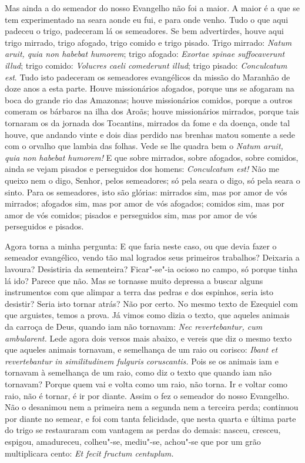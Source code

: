 Mas ainda a do semeador do nosso Evangelho não foi a maior. A maior é a
que se tem experimentado na seara aonde eu fui, e para onde venho. Tudo
o que aqui padeceu o trigo, padeceram lá os semeadores. Se bem
advertirdes, houve aqui trigo mirrado, trigo afogado, trigo comido e
trigo pisado. Trigo mirrado: \emph{Natum aruit, quia non habebat
humorem}; trigo afogado: \emph{Exortae spinae suffocaverunt illud};
trigo comido: \emph{Volucres caeli comederunt illud}; trigo pisado:
\emph{Conculcatum est}. Tudo isto padeceram os semeadores evangélicos
da missão do Maranhão de doze anos a esta parte. Houve missionários
afogados, porque uns se afogaram na boca do grande rio das Amazonas;
houve missionários comidos, porque a outros comeram os bárbaros na ilha
dos Aroãs; houve missionários mirrados, porque tais tornaram os da
jornada dos Tocantins, mirrados da fome e da doença, onde tal houve, que
andando vinte e dois dias perdido nas brenhas matou somente a sede com o
orvalho que lambia das folhas. Vede se lhe quadra bem o \emph{Natum
aruit, quia non habebat humorem!} E que sobre mirrados, sobre
afogados, sobre comidos, ainda se vejam pisados e perseguidos dos
homens: \emph{Conculcatum est!} Não me queixo nem o digo, Senhor, pelos
semeadores; só pela seara o digo, só pela seara o sinto. Para os
semeadores, isto são glórias: mirrados sim, mas por amor de vós
mirrados; afogados sim, mas por amor de vós
afogados; comidos sim, mas por amor de vós comidos; pisados e
perseguidos sim, mas por amor de vós perseguidos e pisados.

Agora torna a minha pergunta: E que faria neste caso, ou que devia fazer
o semeador evangélico, vendo tão mal logrados seus primeiros trabalhos?
Deixaria a lavoura? Desistiria da sementeira? Ficar"-se"-ia ocioso no
campo, só porque tinha lá ido? Parece que não. Mas se tornasse muito
depressa a buscar alguns instrumentos com que alimpar a terra das
pedras e dos espinhos, seria isto desistir? Seria isto tornar atrás?
Não por certo. No mesmo texto de Ezequiel com que arguistes, temos a
prova. Já vimos como dizia o texto, que aqueles animais da carroça de
Deus, quando iam não tornavam: \emph{Nec revertebantur, cum
ambularent.} Lede agora dois versos mais abaixo, e vereis que diz o
mesmo texto que aqueles animais tornavam, e semelhança de um raio ou
corisco: \emph{Ibant et revertebantur in similitudinem fulguris
coruscantis.} Pois se os animais iam e tornavam à semelhança de um raio,
como diz o texto que quando iam não tornavam? Porque quem vai e volta
como um raio, não torna. Ir e voltar como raio, não é tornar, é ir por
diante. Assim o fez o semeador do nosso Evangelho. Não o desanimou nem a
primeira nem a segunda nem a terceira perda; continuou por diante no
semear, e foi com tanta felicidade, que nesta quarta e última parte do
trigo se restauraram com vantagem as perdas do demais: nasceu,
cresceu, espigou, amadureceu, colheu"-se, mediu"-se, achou"-se que por um
grão multiplicara cento: \emph{Et fecit fructum centuplum.}

